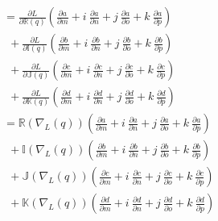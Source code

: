 \documentclass[conference]{IEEEtran}
\begin{document}
\begin{align}
&= \frac{\partial L}{\partial \mathbb{R}(q)} \left( \frac{\partial a}{\partial m} + \textit{i}~\frac{\partial a}{\partial n} + \textit{j}~\frac{\partial a}{\partial o} + \textit{k}~\frac{\partial a}{\partial p} \right) \\ \nonumber
&~~+ \frac{\partial L}{\partial \mathbb{I}(q)} \left( \frac{\partial b}{\partial m} + \textit{i}~\frac{\partial b}{\partial n} + \textit{j}~\frac{\partial b}{\partial o} + \textit{k}~\frac{\partial b}{\partial p} \right) \\ \nonumber
&~~+ \frac{\partial L}{\partial \mathbb{J}(q)} \left( \frac{\partial c}{\partial m} + \textit{i}~\frac{\partial c}{\partial n} + \textit{j}~\frac{\partial c}{\partial o} + \textit{k}~\frac{\partial c}{\partial p} \right) \\ \nonumber
&~~+ \frac{\partial L}{\partial \mathbb{K}(q)} \left( \frac{\partial d}{\partial m} + \textit{i}~\frac{\partial d}{\partial n} + \textit{j}~\frac{\partial d}{\partial o} + \textit{k}~\frac{\partial d}{\partial p} \right) \\ \nonumber
&= \mathbb{R}(\nabla_L(q)) \left( \frac{\partial a}{\partial m} + \textit{i}~\frac{\partial a}{\partial n} + \textit{j}~\frac{\partial a}{\partial o} + \textit{k}~\frac{\partial a}{\partial p} \right) \\ \nonumber
&~~+ \mathbb{I}(\nabla_L(q)) \left( \frac{\partial b}{\partial m} + \textit{i}~\frac{\partial b}{\partial n} + \textit{j}~\frac{\partial b}{\partial o} + \textit{k}~\frac{\partial b}{\partial p} \right) \\ \nonumber
&~~+ \mathbb{J}(\nabla_L(q)) \left( \frac{\partial c}{\partial m} + \textit{i}~\frac{\partial c}{\partial n} + \textit{j}~\frac{\partial c}{\partial o} + \textit{k}~\frac{\partial c}{\partial p} \right) \\ \nonumber
&~~+ \mathbb{K}(\nabla_L(q)) \left( \frac{\partial d}{\partial m} + \textit{i}~\frac{\partial d}{\partial n} + \textit{j}~\frac{\partial d}{\partial o} + \textit{k}~\frac{\partial d}{\partial p} \right)
\label{eq:diff2}
\end{align}
\end{document}

